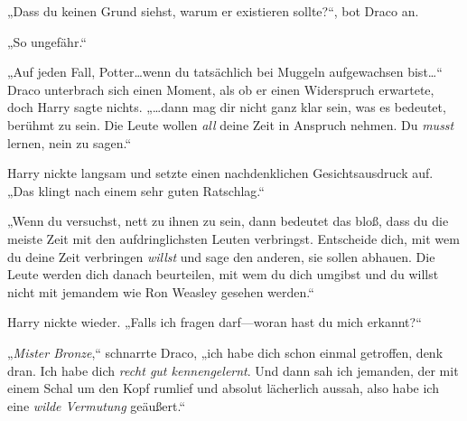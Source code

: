 „Dass du keinen Grund siehst, warum er existieren sollte?“, bot Draco an.

„So ungefähr.“

„Auf jeden Fall, Potter…wenn du tatsächlich bei Muggeln aufgewachsen bist…“ Draco unterbrach sich einen Moment, als ob er einen Widerspruch erwartete, doch Harry sagte nichts. „…dann mag dir nicht ganz klar sein, was es bedeutet, berühmt zu sein. Die Leute wollen \emph{all} deine Zeit in Anspruch nehmen. Du \emph{musst} lernen, nein zu sagen.“

Harry nickte langsam und setzte einen nachdenklichen Gesichtsausdruck auf. „Das klingt nach einem sehr guten Ratschlag.“

„Wenn du versuchst, nett zu ihnen zu sein, dann bedeutet das bloß, dass du die meiste Zeit mit den aufdringlichsten Leuten verbringst. Entscheide dich, mit wem du deine Zeit verbringen \emph{willst} und sage den anderen, sie sollen abhauen. Die Leute werden dich danach beurteilen, mit wem du dich umgibst und du willst nicht mit jemandem wie Ron Weasley gesehen werden.“

Harry nickte wieder. „Falls ich fragen darf—woran hast du mich erkannt?“

„\emph{Mister Bronze},“ schnarrte Draco, „ich habe dich schon einmal getroffen, denk dran. Ich habe dich \emph{recht gut kennengelernt}. Und dann sah ich jemanden, der mit einem Schal um den Kopf rumlief und absolut lächerlich aussah, also habe ich eine \emph{wilde Vermutung} geäußert.“

